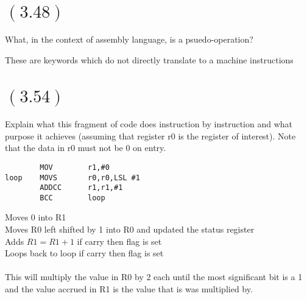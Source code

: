 \documentclass[letterpaper,12pt,titlepage]{article}
\begin{document}
\section*{$(3.48)$} What, in the context of assembly language, is a psuedo-operation?

\begin{mdframed}[style=MyFrame]
These are keywords which do not directly translate to a machine instructions
\end{mdframed}
\newpage
\section*{$(3.54)$} Explain what this fragment of code does instruction by instruction and what purpose it achieves (assuming that register r0 is the register of interest). Note that the data in r0 must not be 0 on entry.
\begin{verbatim}
        MOV        r1,#0
loop    MOVS       r0,r0,LSL #1
        ADDCC      r1,r1,#1
        BCC        loop
\end{verbatim}

\begin{mdframed}[style=MyFrame]
Moves 0 into R1\\
Moves R0 left shifted by 1 into R0 and updated the status register\\
Adds $R1 = R1 + 1$ if carry then flag is set\\
Loops back to loop if carry then flag is set\\ \\

This will multiply the value in R0 by 2 each until the most significant bit is a 1 and the value accrued in R1 is the value that is was multiplied by. 
\end{mdframed}

\newpage
\end{document}

